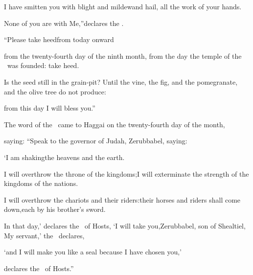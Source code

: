 \begin{inparaenum}
  \pa {} I have smitten you with blight and mildew\pa and hail, all the work of your hands.%
  
  \pa None of you are with Me,''\pa declares the \lord.%
  
  \pa {} ``Please take heed\pa from today onward%
  
  \pa from the twenty-fourth day of the ninth month, from the day the temple of the \lord\ was founded: take heed.%
  
  \pa {} Is the seed%
  still in the grain-pit?%
  \pa Until the vine, the fig, and the pomegranate,%
  \pa and the olive tree do not produce:%
  
  \pa from this day I will bless you.''%
  
  \pb {} The word of the \lord\ came to Haggai on the twenty-fourth day of the month,%
  
  \pa saying:  ``Speak to the governor of Judah, Zerubbabel, saying:%
  
  \pc `I am shaking\pa the heavens and the earth.%
  
  \pb {} I will overthrow the throne of the kingdoms;\pa I will exterminate the strength of the kingdoms%
  of the nations.%
  
  \pc I will overthrow the chariots and their riders:\pa their horses and riders shall come down,\pa each by his brother's sword.%
  
  \pc {} In that day,' declares the \lord\ of Hosts, `I will take you,\pa Zerubbabel, son of Shealtiel, My servant,' the \lord\ declares,%
  
  \pc `and I will make you like a seal%
  \pa because I have chosen you,'%
  
  \pd declares the \lord\ of Hosts.''%
\end{inparaenum}
